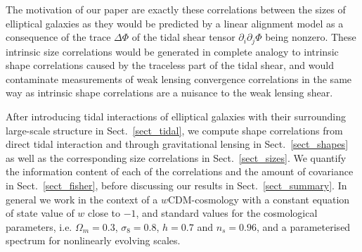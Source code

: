 \documentclass[a4paper,fleqn,usenatbib]{mnras}
\begin{document}
The motivation of our paper are exactly these correlations between the sizes of elliptical galaxies as they would be predicted by a linear alignment model as a consequence of the trace $\Delta\Phi$ of the tidal shear tensor $\partial_i\partial_j\Phi$ being nonzero. These intrinsic size correlations would be generated in complete analogy to intrinsic shape correlations caused by the traceless part of the tidal shear, and would contaminate measurements of weak lensing convergence correlations in the same way as intrinsic shape correlations are a nuisance to the weak lensing shear.

After introducing tidal interactions of elliptical galaxies with their surrounding large-scale structure in Sect.~\ref{sect_tidal}, we compute shape correlations from direct tidal interaction and through gravitational lensing in Sect.~\ref{sect_shapes} as well as the corresponding size correlations in Sect.~\ref{sect_sizes}. We quantify the information content of each of the correlations and the amount of covariance in Sect.~\ref{sect_fisher}, before discussing our results in Sect.~\ref{sect_summary}. In general we work in the context of a $w$CDM-cosmology with a constant equation of state value of $w$ close to $-1$, and standard values for the cosmological parameters, i.e. $\Omega_m = 0.3$, $\sigma_8 =  0.8$, $h = 0.7$ and $n_s = 0.96$, and a parameterised spectrum for nonlinearly evolving scales.


\end{document}
